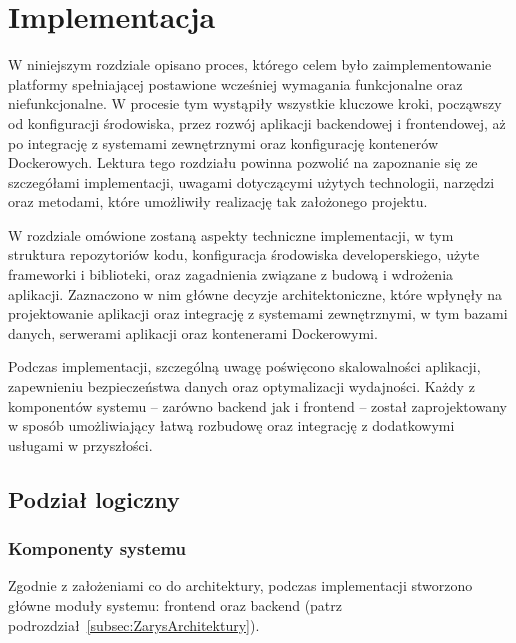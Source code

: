 \chapter{Implementacja}
W niniejszym rozdziale opisano proces, którego celem było zaimplementowanie platformy spełniającej postawione wcześniej wymagania funkcjonalne oraz niefunkcjonalne. 
W procesie tym wystąpiły wszystkie kluczowe kroki, począwszy od konfiguracji środowiska, przez rozwój aplikacji backendowej i frontendowej, aż po integrację z systemami zewnętrznymi oraz konfigurację kontenerów Dockerowych. Lektura tego rozdziału powinna pozwolić na zapoznanie się ze szczegółami implementacji, uwagami dotyczącymi użytych technologii, narzędzi oraz metodami, które umożliwiły realizację tak założonego projektu.

W rozdziale omówione zostaną aspekty techniczne implementacji, w tym struktura repozytoriów kodu, konfiguracja środowiska developerskiego, użyte frameworki i biblioteki, oraz zagadnienia związane z budową i wdrożenia aplikacji. Zaznaczono w nim główne decyzje architektoniczne, które wpłynęły na projektowanie aplikacji oraz integrację z systemami zewnętrznymi, w tym bazami danych, serwerami aplikacji oraz kontenerami Dockerowymi.

Podczas implementacji, szczególną uwagę poświęcono skalowalności aplikacji, zapewnieniu bezpieczeństwa danych oraz optymalizacji wydajności. Każdy z komponentów systemu – zarówno backend jak i frontend – został zaprojektowany w sposób umożliwiający łatwą rozbudowę oraz integrację z dodatkowymi usługami w przyszłości.


\section{Podział logiczny}
\subsection{Komponenty systemu}
Zgodnie z założeniami co do architektury, podczas implementacji stworzono główne moduły systemu: frontend oraz backend (patrz podrozdział~\ref{subsec:ZarysArchitektury}).\\[-10pt]

